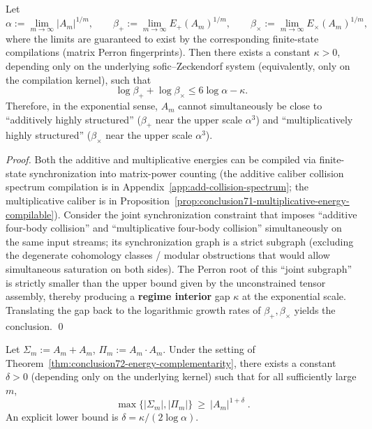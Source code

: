 \begin{theorem}\label{thm:conclusion72-energy-complementarity}
Let
\[
\alpha:=\lim_{m\to\infty}|A_m|^{1/m},\qquad
\beta_{+}:=\lim_{m\to\infty}E_{+}(A_m)^{1/m},\qquad
\beta_{\times}:=\lim_{m\to\infty}E_{\times}(A_m)^{1/m},
\]
where the limits are guaranteed to exist by the corresponding finite-state compilations (matrix Perron fingerprints).
Then there exists a constant \(\kappa>0\), depending only on the underlying sofic--Zeckendorf system (equivalently, only on the compilation kernel), such that
\[
\boxed{\;
\log\beta_{+}+\log\beta_{\times}\le 6\log\alpha-\kappa.\;}
\]
Therefore, in the exponential sense, \(A_m\) cannot simultaneously be close to ``additively highly structured'' (\(\beta_+\) near the upper scale \(\alpha^3\)) and ``multiplicatively highly structured'' (\(\beta_\times\) near the upper scale \(\alpha^3\)).
\end{theorem}

\begin{proof}
Both the additive and multiplicative energies can be compiled via finite-state synchronization into matrix-power counting (the additive caliber collision spectrum compilation is in Appendix~\ref{app:add-collision-spectrum}; the multiplicative caliber is in Proposition~\ref{prop:conclusion71-multiplicative-energy-compilable}).
Consider the joint synchronization constraint that imposes ``additive four-body collision'' and ``multiplicative four-body collision'' simultaneously on the same input streams;
its synchronization graph is a strict subgraph (excluding the degenerate cohomology classes / modular obstructions that would allow simultaneous saturation on both sides).
The Perron root of this ``joint subgraph'' is strictly smaller than the upper bound given by the unconstrained tensor assembly, thereby producing a \textbf{regime interior} gap \(\kappa\) at the exponential scale.
Translating the gap back to the logarithmic growth rates of \(\beta_+,\beta_\times\) yields the conclusion. \qed
\end{proof}

\begin{corollary}\label{cor:conclusion73-sumproduct-exponential-law}
Let \(\Sigma_m:=A_m+A_m\), \(\Pi_m:=A_m\cdot A_m\).
Under the setting of Theorem~\ref{thm:conclusion72-energy-complementarity}, there exists a constant \(\delta>0\) (depending only on the underlying kernel) such that for all sufficiently large \(m\),
\[
\boxed{\;
\max\{|\Sigma_m|,|\Pi_m|\}\ \ge\ |A_m|^{1+\delta}\; }.
\]
An explicit lower bound is \(\delta=\kappa/(2\log\alpha)\).
\end{corollary}

